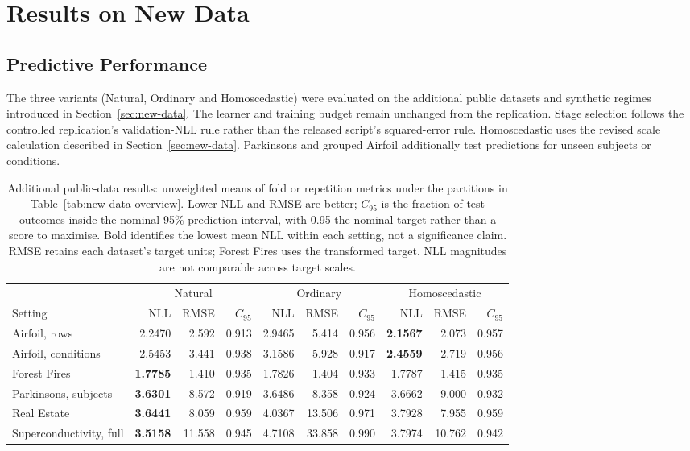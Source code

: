 \section{Results on New Data}
\label{sec:new-results}

\subsection{Predictive Performance}

The three variants (Natural, Ordinary and Homoscedastic) were evaluated on the additional public datasets and synthetic regimes introduced in Section~\ref{sec:new-data}.
The learner and training budget remain unchanged from the replication.
Stage selection follows the controlled replication's validation-NLL rule rather than the released script's squared-error rule.
Homoscedastic uses the revised scale calculation described in Section~\ref{sec:new-data}.
Parkinsons and grouped Airfoil additionally test predictions for unseen subjects or conditions.

\begin{table}[t]
\centering
\small
\setlength{\tabcolsep}{4pt}
\begin{tabular}{@{}lrrrrrrrrr@{}}
\toprule
& \multicolumn{3}{c}{Natural} & \multicolumn{3}{c}{Ordinary} & \multicolumn{3}{c}{Homoscedastic} \\
Setting & NLL & RMSE & $C_{95}$ & NLL & RMSE & $C_{95}$ & NLL & RMSE & $C_{95}$ \\
\midrule
Airfoil, rows & 2.2470 & 2.592 & 0.913 & 2.9465 & 5.414 & 0.956 & \textbf{2.1567} & 2.073 & 0.957 \\
Airfoil, conditions & 2.5453 & 3.441 & 0.938 & 3.1586 & 5.928 & 0.917 & \textbf{2.4559} & 2.719 & 0.956 \\
Forest Fires & \textbf{1.7785} & 1.410 & 0.935 & 1.7826 & 1.404 & 0.933 & 1.7787 & 1.415 & 0.935 \\
Parkinsons, subjects & \textbf{3.6301} & 8.572 & 0.919 & 3.6486 & 8.358 & 0.924 & 3.6662 & 9.000 & 0.932 \\
Real Estate & \textbf{3.6441} & 8.059 & 0.959 & 4.0367 & 13.506 & 0.971 & 3.7928 & 7.955 & 0.959 \\
Superconductivity, full & \textbf{3.5158} & 11.558 & 0.945 & 4.7108 & 33.858 & 0.990 & 3.7974 & 10.762 & 0.942 \\
\bottomrule
\end{tabular}
\caption{Additional public-data results: unweighted means of fold or repetition metrics under the partitions in Table~\ref{tab:new-data-overview}.
Lower NLL and RMSE are better; $C_{95}$ is the fraction of test outcomes inside the nominal 95\% prediction interval, with 0.95 the nominal target rather than a score to maximise.
Bold identifies the lowest mean NLL within each setting, not a significance claim.
RMSE retains each dataset's target units; Forest Fires uses the transformed target.
NLL magnitudes are not comparable across target scales.}
\label{tab:new-public-results}
\end{table}

